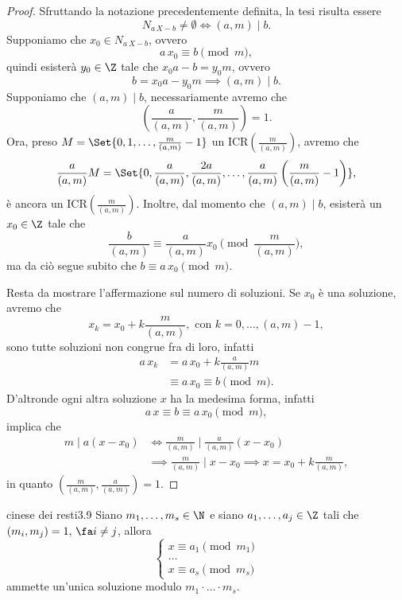 \begin{proof}
	Sfruttando la notazione precedentemente definita, la tesi risulta essere
	\[
		N_{a\,X-b} \neq \emptyset \iff (a,m) \mid b.
	\]
	\graffito{\(\Rightarrow)\)}Supponiamo che \(x_0\in N_{a\,X-b}\), ovvero
	\[
		a\,x_0 \equiv b \pmod{m},
	\]
	quindi esisterà \(y_0\in\Z\) tale che \(x_0 a-b = y_0 m\), ovvero
	\[
		b = x_0 a- y_0 m \implies (a,m) \mid b.
	\]
	\graffito{\(\Leftarrow)\)}Supponiamo che \((a,m) \mid b\), necessariamente avremo che
	\[
		\left( \frac{a}{(a,m)}, \frac{m}{(a,m)} \right) = 1.
	\]
	Ora, preso \(M=\Set{0,1,\ldots,\frac{m}{(a,m)}-1}\) un ICR\(\left(\frac{m}{(a,m)}\right)\), avremo che
	\[
		\frac{a}{(a,m)} M = \Set{0, \frac{a}{(a,m)}, \frac{2a}{(a,m)}, \ldots, \frac{a}{(a,m)} \left( \frac{m}{(a,m)} -1 \right)},
	\]
	è ancora un ICR\(\left( \frac{m}{(a,m)} \right)\).
	Inoltre, dal momento che \((a,m) \mid b\), esisterà un \(x_0\in\Z\) tale che
	\[
		\frac{b}{(a,m)} \equiv \frac{a}{(a,m)}x_0 \pmod{\frac{m}{(a,m)}},
	\]
	ma da ciò segue subito che \(b\equiv a\,x_0 \pmod{m}\).

	Resta da mostrare l'affermazione sul numero di soluzioni.
	Se \(x_0\) è una soluzione, avremo che
	\[
		x_k = x_0+k \frac{m}{(a,m)},\text{ con }k=0,\ldots,(a,m)-1,
	\]
	sono tutte soluzioni non congrue fra di loro, infatti
	\[
		\begin{split}
			a\,x_k & = a\,x_0 + k \frac{a}{(a,m)}m\\
			& \equiv a\,x_0 \equiv b \pmod{m}.
		\end{split}
	\]
	D'altronde ogni altra soluzione \(x\) ha la medesima forma, infatti
	\[
		a\,x \equiv b \equiv a\,x_0 \pmod{m},
	\]
	implica che
	\[
		\begin{split}
			m \mid a(x-x_0) & \iff \frac{m}{(a,m)} \mid \frac{a}{(a,m)}(x-x_0)\\
			& \implies \frac{m}{(a,m)} \mid x-x_0 \implies x = x_0 + k \frac{m}{(a,m)},
		\end{split}
	\]
	in quanto \(\left( \frac{m}{(a,m)}, \frac{a}{(a,m)} \right) = 1\).
\end{proof}

\begin{teor}{cinese dei resti}{3.9}
	Siano \(m_1,\ldots,m_s\in\N\) e siano \(a_1,\ldots,a_j\in\Z\) tali che \((m_i, m_j) = 1,\,\fa i\neq j\), allora
	\[
		\begin{cases}
			x \equiv a_1 \pmod{m_1} \\
			\dots                   \\
			x \equiv a_s \pmod{m_s}
		\end{cases}
	\]
	ammette un'unica soluzione modulo \(m_1 \cdot\ldots\cdot m_s\).
\end{teor}

